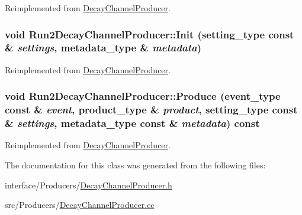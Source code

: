 Reimplemented from \hyperlink{classDecayChannelProducer_a151b0b47507bc8e521fe9acab96d38bc}{DecayChannelProducer}.\hypertarget{classRun2DecayChannelProducer_a882927f7f4db3244af175db88535a496}{
\subsubsection[{Init}]{\setlength{\rightskip}{0pt plus 5cm}void Run2DecayChannelProducer::Init (setting\_\-type const \& {\em settings}, \/  metadata\_\-type \& {\em metadata})}}
\label{classRun2DecayChannelProducer_a882927f7f4db3244af175db88535a496}


Reimplemented from \hyperlink{classDecayChannelProducer_a5876d5fbfeb50e57f802d2f334a1bf4b}{DecayChannelProducer}.\hypertarget{classRun2DecayChannelProducer_a5f16d982e94c38e4c36e97d842bee5be}{
\subsubsection[{Produce}]{\setlength{\rightskip}{0pt plus 5cm}void Run2DecayChannelProducer::Produce (event\_\-type const \& {\em event}, \/  product\_\-type \& {\em product}, \/  setting\_\-type const \& {\em settings}, \/  metadata\_\-type const \& {\em metadata}) const}}
\label{classRun2DecayChannelProducer_a5f16d982e94c38e4c36e97d842bee5be}


Reimplemented from \hyperlink{classDecayChannelProducer_a0e10edeaa5e3ae64023b521237f50003}{DecayChannelProducer}.

The documentation for this class was generated from the following files:\begin{DoxyCompactItemize}
\item 
interface/Producers/\hyperlink{DecayChannelProducer_8h}{DecayChannelProducer.h}\item 
src/Producers/\hyperlink{DecayChannelProducer_8cc}{DecayChannelProducer.cc}\end{DoxyCompactItemize}
